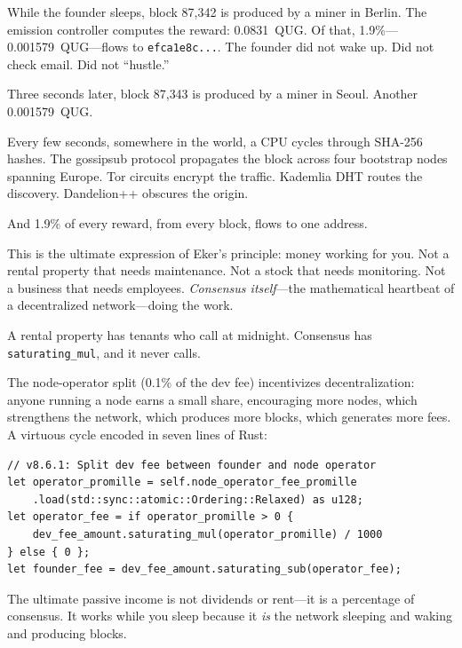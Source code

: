 \documentclass[11pt,a4paper]{article}
\begin{document}
\vspace{0.3cm}

While the founder sleeps, block 87{,}342 is produced by a miner in
Berlin. The emission controller computes the reward:
0.0831~QUG. Of that, 1.9\%---0.001579~QUG---flows to
\texttt{efca1e8c...}. The founder did not wake up. Did not check
email. Did not ``hustle.''

Three seconds later, block 87{,}343 is produced by a miner in Seoul.
Another 0.001579~QUG.

Every few seconds, somewhere in the world, a CPU cycles through SHA-256
hashes. The gossipsub protocol propagates the block across four
bootstrap nodes spanning Europe. Tor circuits encrypt the traffic.
Kademlia DHT routes the discovery. Dandelion++ obscures the origin.

And 1.9\% of every reward, from every block, flows to one address.

This is the ultimate expression of Eker's principle: money working for
you. Not a rental property that needs maintenance. Not a stock that
needs monitoring. Not a business that needs employees.
\emph{Consensus itself}---the mathematical heartbeat of a decentralized
network---doing the work.

A rental property has tenants who call at midnight. Consensus has
\texttt{saturating\_mul}, and it never calls.

The node-operator split (0.1\% of the dev fee) incentivizes
decentralization: anyone running a node earns a small share, encouraging
more nodes, which strengthens the network, which produces more blocks,
which generates more fees. A virtuous cycle encoded in seven lines of
Rust:

\begin{lstlisting}[caption={The Virtuous Cycle (\texttt{block\_producer.rs})}]
// v8.6.1: Split dev fee between founder and node operator
let operator_promille = self.node_operator_fee_promille
    .load(std::sync::atomic::Ordering::Relaxed) as u128;
let operator_fee = if operator_promille > 0 {
    dev_fee_amount.saturating_mul(operator_promille) / 1000
} else { 0 };
let founder_fee = dev_fee_amount.saturating_sub(operator_fee);
\end{lstlisting}

\begin{principle}[title={\textbf{The Principle}}]
The ultimate passive income is not dividends or rent---it is a
percentage of consensus. It works while you sleep because it
\emph{is} the network sleeping and waking and producing blocks.
\end{principle}
\end{document}
